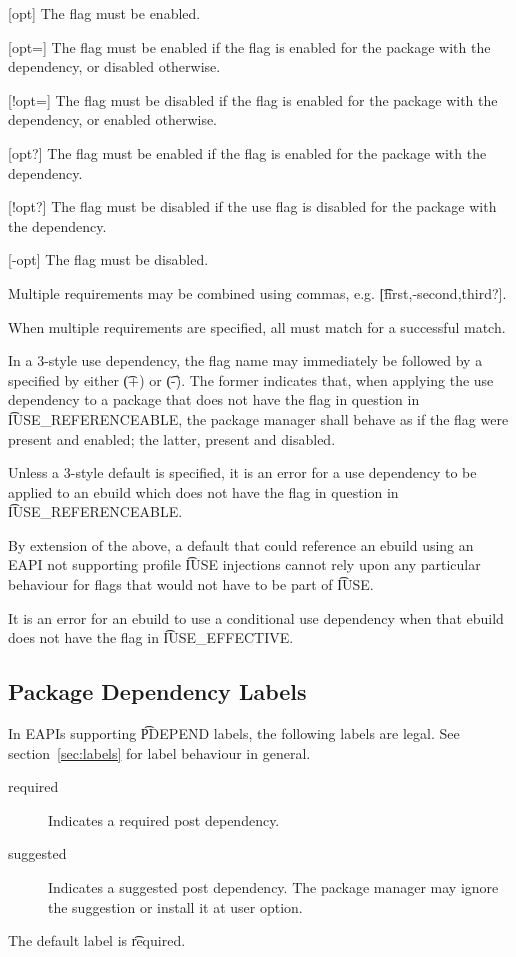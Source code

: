\begin{description}
\item{[opt]} The flag must be enabled.
\item{[opt=]} The flag must be enabled if the flag is enabled for the package with the
    dependency, or disabled otherwise.
\item{[!opt=]} The flag must be disabled if the flag is enabled for the package with the
    dependency, or enabled otherwise.
\item{[opt?]} The flag must be enabled if the flag is enabled for the package with the
    dependency.
\item{[!opt?]} The flag must be disabled if the use flag is disabled for the package with the
    dependency.
\item{[-opt]} The flag must be disabled.
\end{description}

Multiple requirements may be combined using commas, e.g. \t{[first,-second,third?]}.

When multiple requirements are specified, all must match for a successful match.

 In a 3-style use dependency, the flag name may immediately be
followed by a  specified by either \t{(+)} or \t{(-)}. The former indicates that, when
applying the use dependency to a package that does not have the flag in question in
\t{IUSE\_REFERENCEABLE}, the package manager shall behave as if the flag were present and enabled;
the latter, present and disabled.

Unless a 3-style default is specified, it is an error for a use dependency to be applied to an
ebuild which does not have the flag in question in \t{IUSE\_REFERENCEABLE}.

\note By extension of the above, a default that could reference an ebuild using an EAPI not
supporting profile \t{IUSE} injections cannot rely upon any particular behaviour for flags that
would not have to be part of \t{IUSE}.

It is an error for an ebuild to use a conditional use dependency when that ebuild does not have the
flag in \t{IUSE\_EFFECTIVE}.

\IFKDEBUILDELSE
{
    \subsection{Package Dependency Labels}

    In EAPIs supporting \t{PDEPEND} labels, the following labels are legal. See
    section~\ref{sec:labels} for label behaviour in general.

    \begin{description}
    \item[required] Indicates a required post dependency.
    \item[suggested] Indicates a suggested post dependency. The package manager may ignore the
        suggestion or install it at user option.
    \end{description}

    The default label is \t{required}.
}{
}

